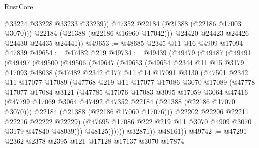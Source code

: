 \begin{lexlean}{RustCore}
\begin{coremodule}
                @33224
                @33228
                @33233
                @33239))
            @47352
            @22184
            (@21388 (@22186 @17003 @3070)))
          @22184
          (@21388 (@22186 @16960 @17042)))
        @24420
        @24423
        @24426
        @24430
        @24435
        @24441))
@49653 := @48685 @2345 @11 @16 @4909 @17094 @47839
@49654 := @47482 @219
@49734 := @49439
    (@49479
      (@49487
        (@49491
          (@49497
            (@49500
              (@49506
                (@49647
                  (@49653
                    (@49654
                      @2344
                      @11
                      @15
                      @3179
                      @17093
                      @48038
                      (@47482
                        @2342
                        @177
                        @11
                        @14
                        @17091
                        @3130
                        (@47501
                          @2342
                          @11
                          @17077
                          @17089
                          (@47768
                            @219
                            @11
                            @17077
                            @17086
                            @3070
                            @17089
                            (@47778
                              @17077
                              @17084
                              @3121
                              (@47785
                                @17076
                                @17083
                                @3095
                                @17059
                                @3064
                                @47416
                                (@47799
                                  @17069
                                  @3064
                                  @47492
                                  @47352
                                  @22184
                                  (@21388 (@22186 @17070 @3070)))
                                @22184
                                (@21388 (@22186 @17060 @17076)))
                              @22202
                              @22206
                              @22211
                              @22216
                              @22222
                              @22229)
                            (@47695 @17086 @222 @219 @11 @3070 @4909 @3070 @3179 @47840 @48039)))
                        @48125))))))
            @32871))
        @48161))
@49742 := @47291 @2362 @2378 @2395 @121 @17128 @17137 @3070 @17874

\end{coremodule}
\end{lexlean}
